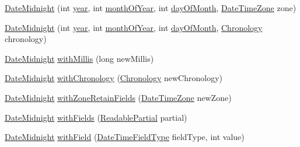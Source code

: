 \begin{DoxyCompactItemize}
\item 
\hyperlink{classorg_1_1joda_1_1time_1_1_date_midnight_ad4b49ea08f94430d400ae9c11ceab09c}{Date\-Midnight} (int \hyperlink{classorg_1_1joda_1_1time_1_1_date_midnight_a01ec5ea504f50bf6338bfa8f40700bae}{year}, int \hyperlink{classorg_1_1joda_1_1time_1_1_date_midnight_a80f137963f1fbf273ac328d831eff685}{month\-Of\-Year}, int \hyperlink{classorg_1_1joda_1_1time_1_1_date_midnight_a051a9b4a5d9a944cabc3db73cc9d7417}{day\-Of\-Month}, \hyperlink{classorg_1_1joda_1_1time_1_1_date_time_zone}{Date\-Time\-Zone} zone)
\item 
\hyperlink{classorg_1_1joda_1_1time_1_1_date_midnight_a986d5859a18e1336da04ba3cca3597d3}{Date\-Midnight} (int \hyperlink{classorg_1_1joda_1_1time_1_1_date_midnight_a01ec5ea504f50bf6338bfa8f40700bae}{year}, int \hyperlink{classorg_1_1joda_1_1time_1_1_date_midnight_a80f137963f1fbf273ac328d831eff685}{month\-Of\-Year}, int \hyperlink{classorg_1_1joda_1_1time_1_1_date_midnight_a051a9b4a5d9a944cabc3db73cc9d7417}{day\-Of\-Month}, \hyperlink{classorg_1_1joda_1_1time_1_1_chronology}{Chronology} chronology)
\item 
\hyperlink{classorg_1_1joda_1_1time_1_1_date_midnight}{Date\-Midnight} \hyperlink{classorg_1_1joda_1_1time_1_1_date_midnight_aced7186a4df6bc83124381df0a0fa421}{with\-Millis} (long new\-Millis)
\item 
\hyperlink{classorg_1_1joda_1_1time_1_1_date_midnight}{Date\-Midnight} \hyperlink{classorg_1_1joda_1_1time_1_1_date_midnight_a458798a9907f8acfbd2c84bcfb467a21}{with\-Chronology} (\hyperlink{classorg_1_1joda_1_1time_1_1_chronology}{Chronology} new\-Chronology)
\item 
\hyperlink{classorg_1_1joda_1_1time_1_1_date_midnight}{Date\-Midnight} \hyperlink{classorg_1_1joda_1_1time_1_1_date_midnight_a4ef953812c6a9134c1885a169353099a}{with\-Zone\-Retain\-Fields} (\hyperlink{classorg_1_1joda_1_1time_1_1_date_time_zone}{Date\-Time\-Zone} new\-Zone)
\item 
\hyperlink{classorg_1_1joda_1_1time_1_1_date_midnight}{Date\-Midnight} \hyperlink{classorg_1_1joda_1_1time_1_1_date_midnight_a8e0897a9108810d0e5c07c58d70f581e}{with\-Fields} (\hyperlink{interfaceorg_1_1joda_1_1time_1_1_readable_partial}{Readable\-Partial} partial)
\item 
\hyperlink{classorg_1_1joda_1_1time_1_1_date_midnight}{Date\-Midnight} \hyperlink{classorg_1_1joda_1_1time_1_1_date_midnight_ab3302e0d420c43b090f141f9741f0303}{with\-Field} (\hyperlink{classorg_1_1joda_1_1time_1_1_date_time_field_type}{Date\-Time\-Field\-Type} field\-Type, int value)

\end{DoxyCompactItemize}
